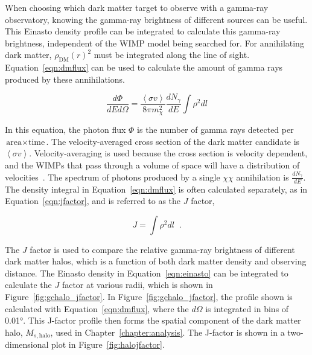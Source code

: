     When choosing which dark matter target to observe with a gamma-ray observatory, knowing the gamma-ray brightness of different sources can be useful.
    This Einasto density profile can be integrated to calculate this gamma-ray brightness, independent of the WIMP model being searched for.
    For annihilating dark matter, $\rho_{\textrm{DM}}\left(r\right)^2$ must be integrated along the line of sight.
    Equation~\ref{eqn:dmflux} can be used to calculate the amount of gamma rays produced by these annihilations.
    
    \begin{equation}\label{eqn:dmflux}
      \frac{ d\Phi }{ dE d \Omega } = \frac{ \left \langle \sigma v \right \rangle }{8 \pi m_\chi^2} \frac{dN_{\gamma}}{dE} \int \rho^2 dl
    \end{equation}
    
    In this equation, the photon flux $\Phi$ is the number of gamma rays detected per $\textrm{area}\times\textrm{time}$.
    The velocity-averaged cross section of the dark matter candidate is $\left \langle \sigma v \right \rangle$.
    Velocity-averaging is used because the cross section is velocity dependent, and the WIMPs that pass through a volume of space will have a distribution of velocities~\cite{wimp_veldist}.
    The spectrum of photons produced by a single $\chi\chi$ annihilation is $\frac{dN_{\gamma}}{dE}$.
    The density integral in Equation~\ref{eqn:dmflux} is often calculated separately, as in Equation~\ref{eqn:jfactor}, and is referred to as the $J$ factor,

    \begin{equation}\label{eqn:jfactor}
      J = \int \rho^2 dl \;\; .
    \end{equation}

    The $J$ factor is used to compare the relative gamma-ray brightness of different dark matter halos, which is a function of both dark matter density and observing distance.
    The Einasto density in Equation~\ref{eqn:einasto} can be integrated to calculate the $J$ factor at various radii, which is shown in Figure~\ref{fig:gchalo_jfactor}.
    In Figure~\ref{fig:gchalo_jfactor}, the profile shown is calculated with Equation~\ref{eqn:dmflux}, where the $d\Omega$ is integrated in bins of \ang{0.01}.
    This J-factor profile then forms the spatial component of the dark matter halo, $M_{s,\textrm{halo}}$, used in Chapter~\ref{chapter:analysis}.
    The J-factor is shown in a two-dimensional plot in Figure~\ref{fig:halojfactor}.
    
